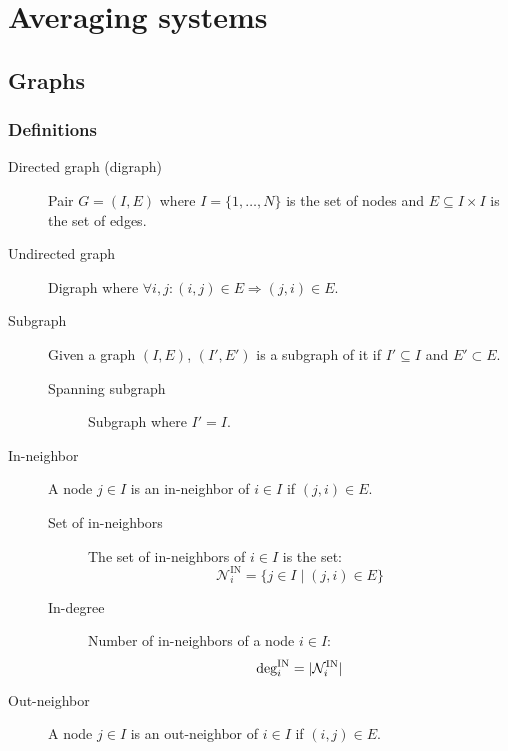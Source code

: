 \chapter{Averaging systems}


\section{Graphs}


\subsection{Definitions}

\begin{description}
    \item[Directed graph (digraph)] 
        Pair $G = (I, E)$ where $I=\{1, \dots, N\}$ is the set of nodes and $E \subseteq I \times I$ is the set of edges.

    \item[Undirected graph] 
        Digraph where $\forall i,j: (i, j) \in E \Rightarrow (j, i) \in E$.

    \item[Subgraph] 
        Given a graph $(I, E)$, $(I', E')$ is a subgraph of it if $I' \subseteq I$ and $E' \subset E$.
        \begin{description}
            \item[Spanning subgraph] Subgraph where $I' = I$.
        \end{description}

    \item[In-neighbor] 
        A node $j \in I$ is an in-neighbor of $i \in I$ if $(j, i) \in E$.

        \begin{description}
            \item[Set of in-neighbors] 
                The set of in-neighbors of $i \in I$ is the set:
                \[ \mathcal{N}_i^\text{IN} = \{ j \in I \mid (j, i) \in E \} \] 

            \item[In-degree] 
                Number of in-neighbors of a node $i \in I$:
                \[ \indeg[i] = | \mathcal{N}_i^\text{IN} | \] 
        \end{description}

    \item[Out-neighbor] 
        A node $j \in I$ is an out-neighbor of $i \in I$ if $(i, j) \in E$.


\end{description}
